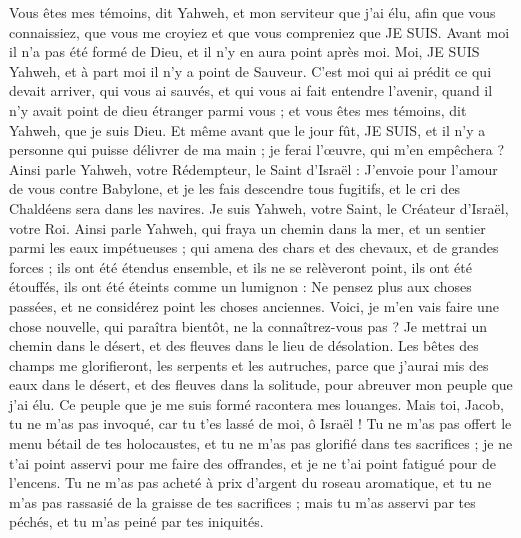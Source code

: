 \begin{multicols}{2}
Vous êtes mes témoins, dit Yahweh, et mon serviteur que j'ai élu, afin que vous connaissiez, que vous me croyiez et que vous compreniez que JE SUIS. Avant moi il n'a pas été formé de Dieu, et il n'y en aura point après moi.
Moi, JE SUIS Yahweh, et à part moi il n'y a point de Sauveur.
C'est moi qui ai prédit ce qui devait arriver, qui vous ai sauvés, et qui vous ai fait entendre l'avenir, quand il n'y avait point de dieu étranger parmi vous ; et vous êtes mes témoins, dit Yahweh, que je suis Dieu.
Et même avant que le jour fût, JE SUIS, et il n'y a personne qui puisse délivrer de ma main ; je ferai l'œuvre, qui m'en empêchera ?
Ainsi parle Yahweh, votre Rédempteur, le Saint d'Israël : J'envoie pour l'amour de vous contre Babylone, et je les fais descendre tous fugitifs, et le cri des Chaldéens sera dans les navires.
Je suis Yahweh, votre Saint, le Créateur d'Israël, votre Roi.
Ainsi parle Yahweh, qui fraya un chemin dans la mer, et un sentier parmi les eaux impétueuses ;
qui amena des chars et des chevaux, et de grandes forces ; ils ont été étendus ensemble, et ils ne se relèveront point, ils ont été étouffés, ils ont été éteints comme un lumignon :
Ne pensez plus aux choses passées, et ne considérez point les choses anciennes.
Voici, je m'en vais faire une chose nouvelle, qui paraîtra bientôt, ne la connaîtrez-vous pas ? Je mettrai un chemin dans le désert, et des fleuves dans le lieu de désolation.
Les bêtes des champs me glorifieront, les serpents et les autruches, parce que j'aurai mis des eaux dans le désert, et des fleuves dans la solitude, pour abreuver mon peuple que j'ai élu.
Ce peuple que je me suis formé racontera mes louanges.
Mais toi, Jacob, tu ne m'as pas invoqué, car tu t'es lassé de moi, ô Israël !
Tu ne m'as pas offert le menu bétail de tes holocaustes, et tu ne m'as pas glorifié dans tes sacrifices ; je ne t'ai point asservi pour me faire des offrandes, et je ne t'ai point fatigué pour de l'encens.
Tu ne m'as pas acheté à prix d'argent du roseau aromatique, et tu ne m'as pas rassasié de la graisse de tes sacrifices ; mais tu m'as asservi par tes péchés, et tu m'as peiné par tes iniquités.

\end{multicols}
